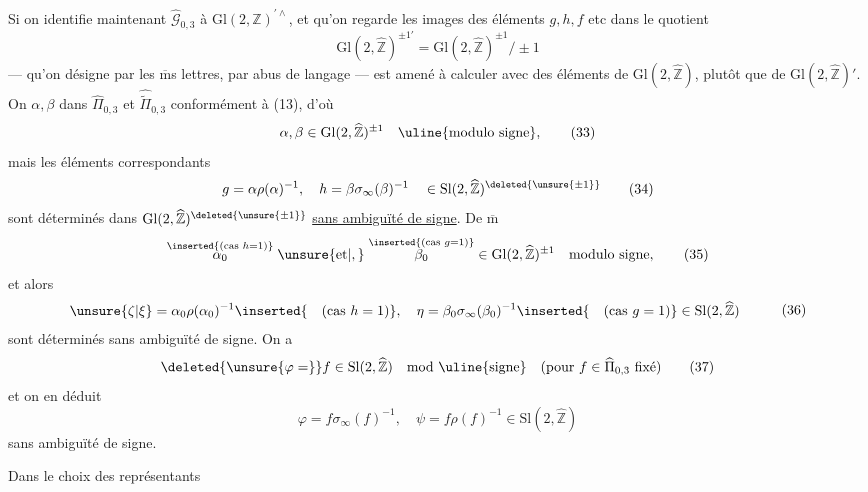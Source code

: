 Si on identifie maintenant $\widehat{\mathcal G}_{0,3}$ à $\mathrm{Gl}(2,\mathbb Z)^{\prime\wedge}$, et qu'on regarde les  images des éléments $g,h,f$ etc dans le quotient
\[
 \mathrm{Gl}(2,\widehat{\mathbb Z})^{\pm1\prime}
 =\mathrm{Gl}(2,\widehat{\mathbb Z})^{\pm1}/\pm1
\]
--- qu'on désigne par les $\overline{\mathrm m}$s lettres, par abus de langage ---  est amené à calculer avec des éléments de $\mathrm{Gl}(2,\widehat{\mathbb Z})$, plutôt que de $\mathrm{Gl}(2,\widehat{\mathbb Z})'$. On  $\alpha,\beta$ dans $\widehat{\Pi}_{0,3}$ et $\widehat{\widetilde{\Pi}}_{0,3}$ conformément à (13), d'où
\[
 \alpha,\beta\in\mathrm{Gl}(2,\widehat{\mathbb Z})^{\pm1}
 \quad\text{\uline{modulo signe}},
 \tag{33}
\]
mais les éléments correspondants
\[
 g=\alpha\rho(\alpha)^{-1},\quad
 h=\beta\sigma_\infty(\beta)^{-1}
 \quad\in\mathrm{Sl}(2,\widehat{\mathbb Z})^{\deleted{\unsure{\pm1}}}
 \tag{34}
\]
sont déterminés dans $\mathrm{Gl}(2,\widehat{\mathbb Z})^{\deleted{\unsure{\pm1}}}$ \uline{sans ambiguïté de signe}. De $\overline{\mathrm m}$
\[
 \overset{\inserted{\text{(cas }h=1\text{)}}}{\alpha_0}
 \;\unsure{\text{et}|,}\;
 \overset{\inserted{\text{(cas }g=1\text{)}}}{\beta_0}
 \in\mathrm{Gl}(2,\widehat{\mathbb Z})^{\pm1}
 \quad\text{modulo signe},
 \tag{35}
\]
et alors
\[
 \begin{aligned}
 \unsure{\zeta|\xi}&=\alpha_0\rho(\alpha_0)^{-1}
 \inserted{\quad\text{(cas }h=1\text{)}},\quad
 \eta=\beta_0\sigma_\infty(\beta_0)^{-1}
 \inserted{\quad\text{(cas }g=1\text{)}}
 \in\mathrm{Sl}(2,\widehat{\mathbb Z})
 \end{aligned}
 \tag{36}
\]
sont déterminés sans ambiguïté de signe. On a
\[
 \deleted{\unsure{\varphi=} }f\in\mathrm{Sl}(2,\widehat{\mathbb Z})
 \quad\text{mod \uline{signe}}
 \quad\text{(pour }f\in\widehat{\Pi}_{0,3}\text{ fixé)}
 \tag{37}
\]
et on en déduit
\[
 \varphi=f\sigma_\infty(f)^{-1},\quad
 \psi=f\rho(f)^{-1}\in\mathrm{Sl}(2,\widehat{\mathbb Z})
 \tag{38}
\]
sans ambiguïté de signe.

 Dans le choix des  représentants




